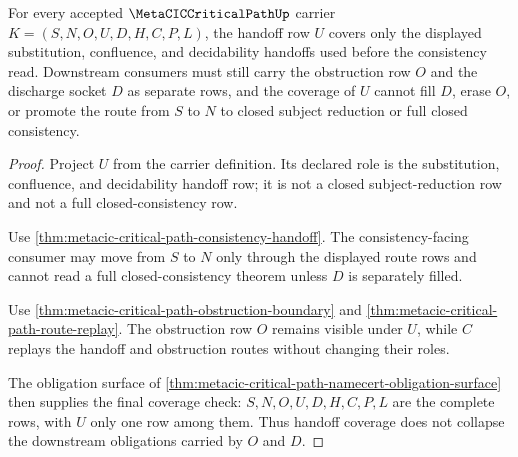 \begin{theorem}
\label{thm:metacic-critical-path-handoff-row-coverage}
For every accepted $\MetaCICCriticalPathUp$ carrier $K=(S,N,O,U,D,H,C,P,L)$, the handoff row $U$ covers only the displayed substitution, confluence, and decidability handoffs used before the consistency read. Downstream consumers must still carry the obstruction row $O$ and the discharge socket $D$ as separate rows, and the coverage of $U$ cannot fill $D$, erase $O$, or promote the route from $S$ to $N$ to closed subject reduction or full closed consistency.
\end{theorem}
\begin{proof}
Project $U$ from the carrier definition. Its declared role is the substitution, confluence, and decidability handoff row; it is not a closed subject-reduction row and not a full closed-consistency row.

Use \autoref{thm:metacic-critical-path-consistency-handoff}. The consistency-facing consumer may move from $S$ to $N$ only through the displayed route rows and cannot read a full closed-consistency theorem unless $D$ is separately filled.

Use \autoref{thm:metacic-critical-path-obstruction-boundary} and \autoref{thm:metacic-critical-path-route-replay}. The obstruction row $O$ remains visible under $U$, while $C$ replays the handoff and obstruction routes without changing their roles.

The obligation surface of \autoref{thm:metacic-critical-path-namecert-obligation-surface} then supplies the final coverage check: $S,N,O,U,D,H,C,P,L$ are the complete rows, with $U$ only one row among them. Thus handoff coverage does not collapse the downstream obligations carried by $O$ and $D$.
\end{proof}

